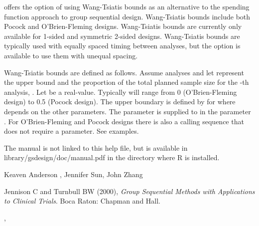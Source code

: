 \begin{Description}\relax
{} offers the option of using Wang-Tsiatis bounds as an alternative to 
the spending function approach to group sequential design.
Wang-Tsiatis bounds include both Pocock and O'Brien-Fleming designs.
Wang-Tsiatis bounds are currently only available for 1-sided and symmetric 2-sided designs.
Wang-Tsiatis bounds are typically used with equally spaced timing between analyses, but
the option is available to use them with unequal spacing.
\end{Description}
\begin{Details}\relax
Wang-Tsiatis bounds are defined as follows.
Assume  analyses and let  represent the upper bound and  the proportion of the
total planned sample size for the -th analysis, 
.
Let  be a real-value. 
Typically  will range from 0 (O'Brien-Fleming design) to 0.5 (Pocock design).
The upper boundary is defined by 
for  where  depends on the other parameters.
The parameter  is supplied to  in the parameter .
For O'Brien-Fleming and Pocock designs there is also a calling sequence that does not require a parameter.
See examples.
\end{Details}
\begin{Note}\relax
The manual is not linked to this help file, but is available in library/gsdesign/doc/manual.pdf
in the directory where R is installed.
\end{Note}
\begin{Author}\relax
Keaven Anderson , Jennifer Sun, John Zhang
\end{Author}
\begin{References}\relax
Jennison C and Turnbull BW (2000), \emph{Group Sequential Methods with Applications to Clinical Trials}.
Boca Raton: Chapman and Hall.
\end{References}
\begin{SeeAlso}\relax
{}, 
\end{SeeAlso}
